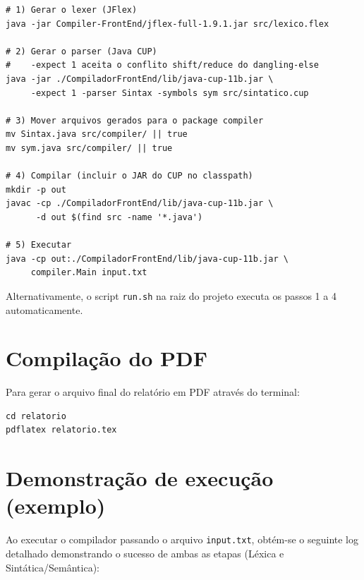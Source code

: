 \documentclass[a4paper,12pt]{article}
\begin{document}
\begin{verbatim}
# 1) Gerar o lexer (JFlex)
java -jar Compiler-FrontEnd/jflex-full-1.9.1.jar src/lexico.flex

# 2) Gerar o parser (Java CUP)
#    -expect 1 aceita o conflito shift/reduce do dangling-else
java -jar ./CompiladorFrontEnd/lib/java-cup-11b.jar \
     -expect 1 -parser Sintax -symbols sym src/sintatico.cup

# 3) Mover arquivos gerados para o package compiler
mv Sintax.java src/compiler/ || true
mv sym.java src/compiler/ || true

# 4) Compilar (incluir o JAR do CUP no classpath)
mkdir -p out
javac -cp ./CompiladorFrontEnd/lib/java-cup-11b.jar \
      -d out $(find src -name '*.java')

# 5) Executar
java -cp out:./CompiladorFrontEnd/lib/java-cup-11b.jar \
     compiler.Main input.txt
\end{verbatim}

Alternativamente, o script \texttt{run.sh} na raiz do projeto executa os passos 1 a 4 automaticamente.

\section{Compilação do PDF}
Para gerar o arquivo final do relatório em PDF através do terminal:
\begin{verbatim}
cd relatorio
pdflatex relatorio.tex
\end{verbatim}

\section{Demonstração de execução (exemplo)}
Ao executar o compilador passando o arquivo \texttt{input.txt}, obtém-se o seguinte log detalhado demonstrando o sucesso de ambas as etapas (Léxica e Sintática/Semântica):
\end{document}
